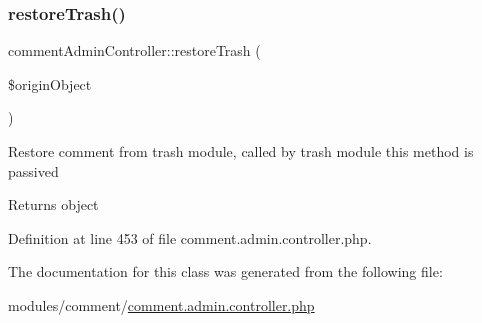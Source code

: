 \subsubsection{\texorpdfstring{restore\+Trash()}{restoreTrash()}}
{\footnotesize\ttfamily comment\+Admin\+Controller\+::restore\+Trash (\begin{DoxyParamCaption}\item[{}]{\$origin\+Object }\end{DoxyParamCaption})}

Restore comment from trash module, called by trash module this method is passived \begin{DoxyReturn}{Returns}
object 
\end{DoxyReturn}


Definition at line 453 of file comment.\+admin.\+controller.\+php.



The documentation for this class was generated from the following file\+:\begin{DoxyCompactItemize}
\item 
modules/comment/\hyperlink{comment_8admin_8controller_8php}{comment.\+admin.\+controller.\+php}\end{DoxyCompactItemize}
